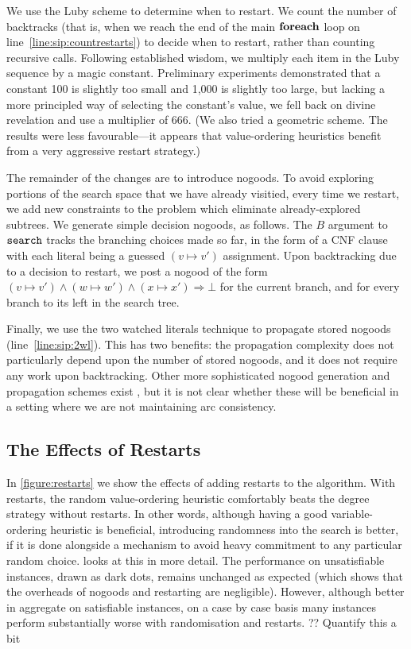 \documentclass{article}
\newcommand{\citep}[1]{\cite{#1}}
\newcommand{\siplineref}[1]{line~\ref{line:sip:#1}}
\begin{document}
We use the Luby scheme \citep{DBLP:journals/ipl/LubySZ93} to determine when to restart. We count the
number of backtracks (that is, when we reach the end of the main $\KwSty{foreach}$ loop on
\siplineref{countrestarts}) to decide when to restart, rather than counting recursive calls.
Following established wisdom, we multiply each item in the Luby sequence by a magic constant.
Preliminary experiments demonstrated that a constant 100 is slightly too small and 1,000 is slightly
too large, but lacking a more principled way of selecting the constant's value, we fell back on
divine revelation and use a multiplier of 666. (We also tried a geometric scheme. The results were
less favourable---it appears that value-ordering heuristics benefit from a very aggressive restart
strategy.)

The remainder of the changes are to introduce nogoods. To avoid exploring portions of the search
space that we have already visitied, every time we restart, we add new constraints to the problem
which eliminate already-explored subtrees. We generate simple decision nogoods, as follows. The $B$
argument to $\FuncSty{search}$ tracks the branching choices made so far, in the form of a CNF clause
with each literal being a guessed $(v \mapsto v')$ assignment. Upon backtracking due to a decision to
restart, we post a nogood of the form $(v \mapsto v') \wedge (w \mapsto w') \wedge (x \mapsto x')
\Rightarrow \bot$ for the current branch, and for every branch to its left in the search tree.

Finally, we use the two watched literals technique \citep{DBLP:conf/dac/MoskewiczMZZM01} to
propagate stored nogoods (\siplineref{2wl}). This has two benefits: the propagation complexity does
not particularly depend upon the number of stored nogoods, and it does not require any work upon
backtracking.  Other more sophisticated nogood generation and propagation schemes exist
\citep{DBLP:conf/aaai/LeeSZ16,DBLP:conf/cp/GlorianBLLM17}, but it is not clear whether these will be
beneficial in a setting where we are not maintaining arc consistency.

\subsection{The Effects of Restarts}

In \cref{figure:restarts} we show the effects of adding restarts to the algorithm. With restarts,
the random value-ordering heuristic comfortably beats the degree strategy without restarts. In other
words, although having a good variable-ordering heuristic is beneficial, introducing randomness into
the search is better, if it is done alongside a mechanism to avoid heavy commitment to any
particular random choice.  looks at this in more detail. The performance
on unsatisfiable instances, drawn as dark dots, remains unchanged as expected (which shows that the
overheads of nogoods and restarting are negligible). However, although better in aggregate on
satisfiable instances, on a case by case basis many instances perform substantially worse with
randomisation and restarts. ?? Quantify this a bit
\end{document}
